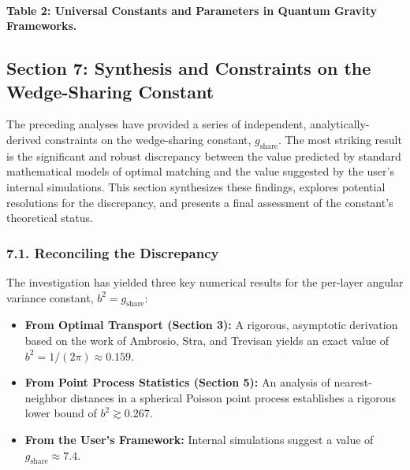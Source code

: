 \documentclass[11pt]{article}
\begin{document}
\paragraph{Table 2: Universal Constants and Parameters in Quantum Gravity Frameworks.}
\begin{center}
\end{center}

\subsection*{Section 7: Synthesis and Constraints on the Wedge-Sharing Constant}
The preceding analyses have provided a series of independent, analytically-derived constraints on the wedge-sharing constant, $g_{\mathrm{share}}$. The most striking result is the significant and robust discrepancy between the value predicted by standard mathematical models of optimal matching and the value suggested by the user’s internal simulations. This section synthesizes these findings, explores potential resolutions for the discrepancy, and presents a final assessment of the constant’s theoretical status.

\subsubsection*{7.1. Reconciling the Discrepancy}
The investigation has yielded three key numerical results for the per-layer angular variance constant, $b^2 = g_{\mathrm{share}}$:
\begin{itemize}
  \item \textbf{From Optimal Transport (Section 3):} A rigorous, asymptotic derivation based on the work of Ambrosio, Stra, and Trevisan yields an exact value of $b^2 = 1/(2\pi) \approx 0.159$.
  \item \textbf{From Point Process Statistics (Section 5):} An analysis of nearest-neighbor distances in a spherical Poisson point process establishes a rigorous lower bound of $b^2 \gtrsim 0.267$.
  \item \textbf{From the User’s Framework:} Internal simulations suggest a value of $g_{\mathrm{share}} \approx 7.4$.
\end{itemize}
\end{document}
